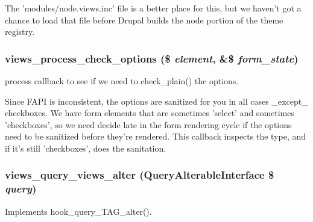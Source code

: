 The 'modules/node.views.inc' file is a better place for this, but we haven't got a chance to load that file before Drupal builds the node portion of the theme registry. \hypertarget{views_8module_a15e88bdb192b9928200f4304f010acb1}{
\subsubsection[{views\_\-process\_\-check\_\-options}]{\setlength{\rightskip}{0pt plus 5cm}views\_\-process\_\-check\_\-options (\$ {\em element}, \/  \&\$ {\em form\_\-state})}}
\label{views_8module_a15e88bdb192b9928200f4304f010acb1}
process callback to see if we need to check\_\-plain() the options.

Since FAPI is inconsistent, the options are sanitized for you in all cases \_\-except\_\- checkboxes. We have form elements that are sometimes 'select' and sometimes 'checkboxes', so we need decide late in the form rendering cycle if the options need to be sanitized before they're rendered. This callback inspects the type, and if it's still 'checkboxes', does the sanitation. \hypertarget{views_8module_a621a7deea033fadbb8de49ef7795a8b7}{
\subsubsection[{views\_\-query\_\-views\_\-alter}]{\setlength{\rightskip}{0pt plus 5cm}views\_\-query\_\-views\_\-alter (QueryAlterableInterface \$ {\em query})}}
\label{views_8module_a621a7deea033fadbb8de49ef7795a8b7}
Implements hook\_\-query\_\-TAG\_\-alter().


